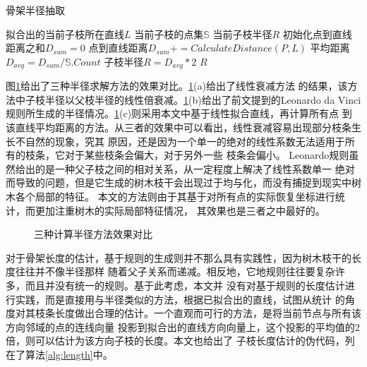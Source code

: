 \begin{algorithm}[H]
	\caption{骨架半径抽取}
	\label{alg:radius}
	\begin{algorithmic}[1] 
		\Require 拟合出的当前子枝所在直线$L$
		\Require 当前子枝的点集$\mathbb{S}$
		\Ensure 当前子枝半径$R$
		\State 初始化点到直线距离之和$D_{sum}=0$
		\State 点到直线距离$D_{sum}+=CalculateDistance(P, L)$
		\EndFor
		\State 平均距离$D_{avg}=D_{sum}/\mathbb{S}.Count$
		\State 子枝半径$R=D_{avg}*2$
		\State \Return $R$
	\end{algorithmic}
\end{algorithm}

图\ref{fig:radius}给出了三种半径求解方法的效果对比。\ref{fig:radius}(a)给出了线性衰减方法
的结果，该方法中子枝半径以父枝半径的线性倍衰减。\ref{fig:radius}(b)给出了前文提到的Leonardo
 da Vinci规则所生成的半径情况。\ref{fig:radius}(c)则采用本文中基于线性拟合直线，再计算所有点
 到该直线平均距离的方法。从三者的效果中可以看出，线性衰减容易出现部分枝条生长不自然的现象，究其
 原因，还是因为一个单一的绝对的线性系数无法适用于所有的枝条，它对于某些枝条会偏大，对于另外一些
 枝条会偏小。 Leonardo规则虽然给出的是一种父子枝之间的相对关系，从一定程度上解决了线性系数单一
 绝对而导致的问题，但是它生成的树木枝干会出现过于均与化，而没有捕捉到现实中树木各个局部的特征。
 本文的方法则由于其基于对所有点的实际恢复坐标进行统计，而更加注重树木的实际局部特征情况，
 其效果也是三者之中最好的。
 \begin{figure}[H]
	\centering
	\hspace{4em}
	\hspace{4em}
	\hspace{4em}
	\hspace{4em}
	\caption{三种计算半径方法效果对比}
	\label{fig:radius}
\end{figure}

对于骨架长度的估计，基于规则的生成则并不那么具有实践性，因为树木枝干的长度往往并不像半径那样
随着父子关系而递减。相反地，它地规则往往要复杂许多，而且并没有统一的规则。基于此考虑，本文并
没有对基于规则的长度估计进行实践，而是直接用与半径类似的方法，根据已拟合出的直线，试图从统计
的角度对其枝条长度做出合理的估计。一个直观而可行的方法，是将当前节点与所有该方向邻域的点的连线向量
投影到拟合出的直线方向向量上，这个投影的平均值的2倍，则可以估计为该方向子枝的长度。本文也给出了
子枝长度估计的伪代码，列在了算法\ref{alg:length}中。

